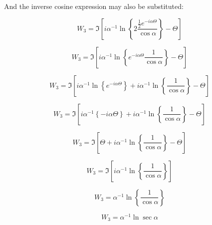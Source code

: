\documentclass[a4paper]{report}
\begin{document}
And the inverse cosine expression may also be substituted:

\begin{equation}
W_{3} = \Im \left[  
 i \alpha^{-1} \ln 
 \left\{ 2 \frac{\frac{1}{2} e^{-i \alpha \Theta}}{\cos \alpha} \right\} - \Theta
   \right]
\end{equation}

\begin{equation}
W_{3} = \Im \left[  
 i \alpha^{-1} \ln 
 \left\{ e^{-i \alpha \Theta} \frac{1 }{\cos \alpha} \right\} - \Theta
   \right]
\end{equation}

\begin{equation}
W_{3} = \Im \left[  
 i \alpha^{-1} \ln 
 \left\{ e^{-i \alpha \Theta}  \right\}
+
i \alpha^{-1} \ln 
 \left\{ \frac{1 }{\cos \alpha} \right\} 
  - \Theta
   \right]
\end{equation}

\begin{equation}
W_{3} = \Im \left[  
 i \alpha^{-1} 
 \left\{ -i \alpha \Theta  \right\}
+
i \alpha^{-1} \ln 
 \left\{ \frac{1 }{\cos \alpha} \right\} 
  - \Theta
   \right]
\end{equation}


\begin{equation}
W_{3} = \Im \left[  
\Theta
+
i \alpha^{-1} \ln 
 \left\{ \frac{1 }{\cos \alpha} \right\} 
  - \Theta
   \right]
\end{equation}

\begin{equation}
W_{3} = \Im \left[  
i \alpha^{-1} \ln 
 \left\{ \frac{1 }{\cos \alpha} \right\} 
   \right]
\end{equation}

\begin{equation}
W_{3} =
\alpha^{-1} \ln 
 \left\{ \frac{1 }{\cos \alpha} \right\} 
\end{equation}

\begin{equation}
W_{3} =
\alpha^{-1} \ln \sec \alpha
\end{equation}
\end{document}
